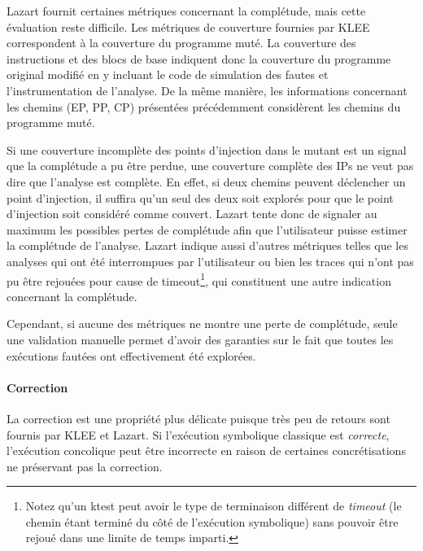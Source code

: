                     Lazart fournit certaines métriques concernant la complétude, mais cette évaluation reste difficile.
                    Les métriques de couverture fournies par KLEE correspondent à la couverture du programme muté. La couverture des instructions et des blocs de base indiquent donc la couverture du programme original modifié en y incluant le code de simulation des fautes et l'instrumentation de l'analyse.
                    De la même manière, les informations concernant les chemins (EP, PP, CP) présentées précédemment considèrent les chemins du programme muté.
                    
                    Si une couverture incomplète des points d'injection dans le mutant est un signal que la complétude a pu être perdue, une couverture complète des IPs ne veut pas dire que l'analyse est complète.
                    En effet, si deux chemins peuvent déclencher un point d'injection, il suffira qu'un seul des deux soit explorés pour que le point d'injection soit considéré comme couvert. 
                    Lazart tente donc de signaler au maximum les possibles pertes de complétude afin que l'utilisateur puisse estimer la complétude de l'analyse.
                    Lazart indique aussi d'autres métriques telles que les analyses qui ont été interrompues par l'utilisateur ou bien les traces qui n'ont pas pu être rejouées pour cause de timeout\footnote{Notez qu'un ktest peut avoir le type de terminaison différent de \textit{timeout} (le chemin étant terminé du côté de l'exécution symbolique) sans pouvoir être rejoué dans une limite de temps imparti.}, qui constituent une autre indication concernant la complétude.
                    
                    Cependant, si aucune des métriques ne montre une perte de complétude, seule une validation manuelle permet d'avoir des garanties sur le fait que toutes les exécutions fautées ont effectivement été explorées.
                
                    \paragraph{Correction}
                    
                    La correction est une propriété plus délicate puisque très peu de retours sont fournis par KLEE et Lazart.
                    Si l'exécution symbolique classique est \textit{correcte}, l'exécution concolique peut être incorrecte en raison de certaines concrétisations ne préservant pas la correction.
                    
